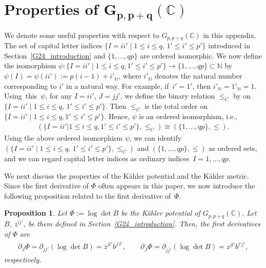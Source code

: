 \documentclass[10pt,a4paper]{amsart}
\numberwithin{equation}{section}
\newtheorem{Proposition}[Theorem]{Proposition}
 { \theoremstyle{definition}
\newtheorem{Definition}[Theorem]{Definition}
\newtheorem{Note}[Theorem]{Note}
\newtheorem{Example}[Theorem]{Example}
\newtheorem{Remark}[Theorem]{Remark} }
\begin{document}
\section[Properties of G\_\{p,p+q\}(C)]{Properties of $\boldsymbol{G_{p,p+q}(\mathbb{C})}$}
\label{appendix_properties_Gpq}

We denote some useful properties with respect to $G_{p,p+q}(\mathbb{C})$ in this appendix. The set of capital letter indices $\{I=ii'\mid 1\leq i\leq q,\, 1'\leq i'\leq p' \}$ introduced in Section~\ref{G24_introduction} and
$\{1,\dots,qp\}$
are ordered isomorphic. We now define the isomorphism
$ \psi\colon \{ I=ii' \mid {1 \leq i \leq q},\allowbreak 1' \leq i' \leq p'\} \to\{ 1,\dots,qp\} \subset \mathbb{N}$
by
$
 \psi
( I)
 =
 \psi
 (
 ii'
 )
 :=
 p
(
 i-1
)
 +
 {i'}_{\mathbb{N}}$,
where ${i'}_{\mathbb{N}}$ denotes the natural number corresponding to $i'$ in a natural way. For example, if~${i'=1'}$, then ${i'}_{\mathbb{N}}={1'}_{\mathbb{N}}=1$.
Using~this~$\psi$, for any
$
 I
 =
 ii'$,
$
 J=jj'
$,
we define the binary relation $\leq_{C}$ by
on~${
 \{
 I=ii'
 \mid
 1
 \leq
 i
 \leq
 q,\,
 1'
 \leq
 i'
 \leq
 p'
 \}}
$.
Then $\leq_{C}$ is the total order
on $\{I=ii'\mid 1\leq i\leq q,\allowbreak {1'\leq i'\leq p'}\}$. Hence, $\psi$ is an ordered isomorphism, i.e.,
\begin{align*}
 (
 \{
 I=ii'
 |
 1
 \leq
 i
 \leq
 q,
 1'
 \leq
 i'
 \leq
 p'
 \},
 \leq_{C}
 )
 \cong
 (
 \{
 1,\dots,qp
 \},
 \leq
 ).
\end{align*}
Using the above ordered isomorphism $\psi$, we can identify
$
 (
 \{
 I=ii'
\mid
 1
 \leq
 i
 \leq
 q,\,
 1'
 \leq
 i'
 \leq
 p'
 \},\allowbreak
 \leq_{C}
 )
$
and
$
 (
 \{
 1,\dots,qp
 \},
 \leq
 )
$
as ordered sets, and we can regard capital letter indices as ordinary indices~${I=1,\dots,qp}$.

We next discuss the properties of
the K\"ahler potential and the K\"ahler metric.
Since the first derivative of $\Phi$ often appears in this paper, we now introduce the following proposition related to the first derivative of~$\Phi$.

\begin{Proposition}\label{prop_first_deriv_potential}
Let
$
\Phi
:=
\log
\det
B
$
be the K\"ahler potential of $G_{p,p+q}(\mathbb{C})$. Let
$
B$, $
z^{ij'}$,
be them defined in Section~{\rm\ref{G24_introduction}}. Then, the first derivatives of $\Phi$ are
\begin{align}
 \partial_{J}
 \Phi
 =
 \partial_{jj'}
 (
 \log
 \det
 B
 )
 =
 \overline{z}^{jl'}
 b^{j'\overline{l'}},
 \qquad
 \partial_{\overline{J}}
 \Phi
 =
 \partial_{\overline{jj'}}
 (
 \log
 \det
 B
 )
 =
 z^{jl'}
 b^{l'\overline{j'}},
 \label{partial_1st}
\end{align}
respectively.
\end{Proposition}
\end{document}
